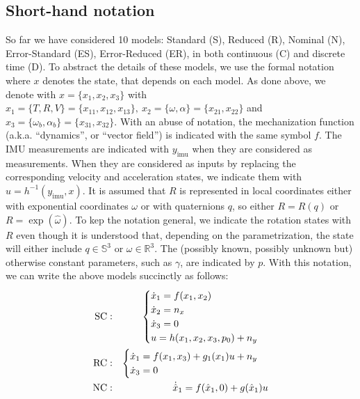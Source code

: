 \documentclass[]{article}
\def\real{\mathbb{R}}
\def\w{\omega}
\def\imu{_\mathrm{imu}}
\begin{document}
{\subsection{Short-hand notation}
%
So far we have considered 10 models: Standard (S), Reduced (R), Nominal (N), Error-Standard (ES), Error-Reduced (ER), in both continuous (C) and discrete time (D). To abstract the details of these models, we use the formal notation where $x$ denotes the state, that depends on each model. As done above, we denote with $x = \{x_1, x_2, x_3\}$ with $x_1 = \{T, R, V\} = \{x_{11}, x_{12}, x_{13}\}, \ 
x_2 = \{\w, \alpha\} = \{x_{21}, x_{22}\}$ and $x_3 = \{\w_b, \alpha_b\} =  \{x_{31}, x_{32}\}$.  With an abuse of notation, the mechanization function (a.k.a. ``dynamics'', or ``vector field'') is indicated with the same symbol $f$. The IMU measurements are indicated with $y\imu $ when they are considered as measurements. When they are considered as inputs by replacing the corresponding velocity and acceleration states, we indicate them with $u = h^{-1}(y\imu ,x)$. It is assumed that $R$ is represented in local coordinates either with exponential coordinates $\w$ or with quaternions $q$, so either $R = R(q)$ or $R = \exp(\widehat \w)$. To kep the notation general, we indicate the rotation states with $R$ even though it is understood that, depending on the parametrization, the state will either include $q \in {\mathbb S}^3$ or $\w \in \real^3$. The (possibly known, possibly unknown but) otherwise constant parameters, such as $\gamma$, are indicated by $p$. 
With this notation, we can write the above models succinctly as follows:
\begin{eqnarray}
{\rm SC:} && 
\begin{cases}
\dot x_1  = f(x_1, x_2)  \\
\dot x_2 = n_x \\
\dot x_3 = 0 \\
u = h(x_1,x_2, x_3,p_0) + n_y
\end{cases}
\nonumber\\
{\rm RC:} && 
\begin{cases}
\dot x_1  = f(x_1, x_3) + g_1(x_1) u +   n_y\\
\dot x_3 = 0
\end{cases}\nonumber\\
{\rm NC:} && %
\dot{\hat x}_1 = f(\hat x_1,0) + g(\hat x_1) u   %
\nonumber\\

\end{eqnarray}}
\end{document}
